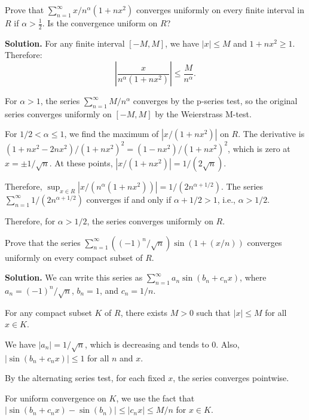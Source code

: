 \begin{problembox}
Prove that \(\sum_{n=1}^{\infty} x/n^\alpha (1 + nx^2)\) converges uniformly on every finite interval in \( R \) if \( \alpha > \frac{1}{2} \). Is the convergence uniform on \( R \)?
\end{problembox}

\noindent\textbf{Solution.} For any finite interval \([-M, M]\), we have \( |x| \leq M \) and \( 1 + nx^2 \geq 1 \). Therefore:
\[\left|\frac{x}{n^\alpha (1 + nx^2)}\right| \leq \frac{M}{n^\alpha}.\]

For \( \alpha > 1 \), the series \( \sum_{n=1}^{\infty} M/n^\alpha \) converges by the p-series test, so the original series converges uniformly on \([-M, M]\) by the Weierstrass M-test.

For \( 1/2 < \alpha \leq 1 \), we find the maximum of \( |x/(1 + nx^2)| \) on \( R \). The derivative is \( (1 + nx^2 - 2nx^2)/(1 + nx^2)^2 = (1 - nx^2)/(1 + nx^2)^2 \), which is zero at \( x = \pm 1/\sqrt{n} \). At these points, \( |x/(1 + nx^2)| = 1/(2\sqrt{n}) \).

Therefore, \( \sup_{x \in R} |x/(n^\alpha (1 + nx^2))| = 1/(2n^{\alpha + 1/2}) \). The series \( \sum_{n=1}^{\infty} 1/(2n^{\alpha + 1/2}) \) converges if and only if \( \alpha + 1/2 > 1 \), i.e., \( \alpha > 1/2 \).

Therefore, for \( \alpha > 1/2 \), the series converges uniformly on \( R \).

\begin{problembox}
Prove that the series \(\sum_{n=1}^{\infty} ((-1)^n/\sqrt{n}) \sin (1 + (x/n))\) converges uniformly on every compact subset of \( R \).
\end{problembox}

\noindent\textbf{Solution.} We can write this series as \( \sum_{n=1}^{\infty} a_n \sin(b_n + c_n x) \), where \( a_n = (-1)^n/\sqrt{n} \), \( b_n = 1 \), and \( c_n = 1/n \).

For any compact subset \( K \) of \( R \), there exists \( M > 0 \) such that \( |x| \leq M \) for all \( x \in K \).

We have \( |a_n| = 1/\sqrt{n} \), which is decreasing and tends to 0. Also, \( |\sin(b_n + c_n x)| \leq 1 \) for all \( n \) and \( x \).

By the alternating series test, for each fixed \( x \), the series converges pointwise.

For uniform convergence on \( K \), we use the fact that \( |\sin(b_n + c_n x) - \sin(b_n)| \leq |c_n x| \leq M/n \) for \( x \in K \).

